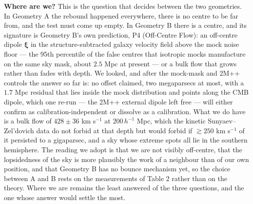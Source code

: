 \documentclass[
]{article}
\begin{document}
\textbf{Where are we?} This is the question that decides between the two
geometries. In Geometry A the rebound happened everywhere, there is no
centre to be far from, and the test must come up empty. In Geometry B
there is a centre, and its signature is Geometry B's own prediction, P4
(Off-Centre Flow): an off-centre dipole \(\boldsymbol{\xi}\) in the
structure-subtracted galaxy velocity field above the mock noise floor
--- the 95th percentile of the false centres that isotropic mocks
manufacture on the same sky mask, about \(2.5\) Mpc at present --- or a
bulk flow that grows rather than fades with depth. We looked, and after
the mock-mask and 2M++ controls the answer so far is: no offset claimed,
two megaparsecs at most, with a \(1.7\) Mpc residual that lies inside
the mock distribution and points along the CMB dipole, which one re-run
--- the 2M++ external dipole left free --- will either confirm as
calibration-independent or dissolve as a calibration. What we do have is
a bulk flow of \(428 \pm 36\) km s\(^{-1}\) at \(200\,h^{-1}\) Mpc,
which the kinetic Sunyaev--Zel'dovich data do not forbid at that depth
but would forbid if \(\gtrsim 250\) km s\(^{-1}\) of it persisted to a
gigaparsec, and a sky whose extreme spots all lie in the southern
hemisphere. The reading we adopt is that we are not visibly off-centre,
that the lopsidedness of the sky is more plausibly the work of a
neighbour than of our own position, and that Geometry B has no bounce
mechanism yet, so the choice between A and B rests on the measurements
of Table 2 rather than on the theory. Where we are remains the least
answered of the three questions, and the one whose answer would settle
the most.
\end{document}
